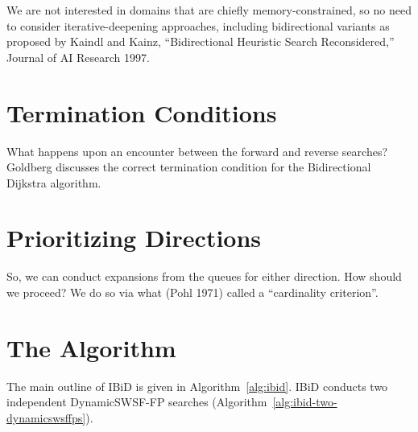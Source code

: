 \documentclass[nobib]{tufte-book}
\begin{document}
We are not interested in domains that are chiefly memory-constrained,
so no need to consider iterative-deepening approaches,
including bidirectional variants as proposed by
Kaindl and Kainz, ``Bidirectional Heuristic Search Reconsidered,''
Journal of AI Research 1997.

\section{Termination Conditions}

What happens upon an encounter between the forward and reverse searches?
Goldberg \citep{goldberg2005spexternalmemory}
discusses the correct termination condition for the 
Bidirectional Dijkstra algorithm.

\section{Prioritizing Directions}

So, we can conduct expansions from the queues for either direction.
How should we proceed?
We do so via what (Pohl 1971) called a ``cardinality criterion''.

\section{The Algorithm}

The main outline of IBiD is given in Algorithm~\ref{alg:ibid}.
IBiD conducts two independent DynamicSWSF-FP searches
(Algorithm~\ref{alg:ibid-two-dynamicswsffps}).
\end{document}
